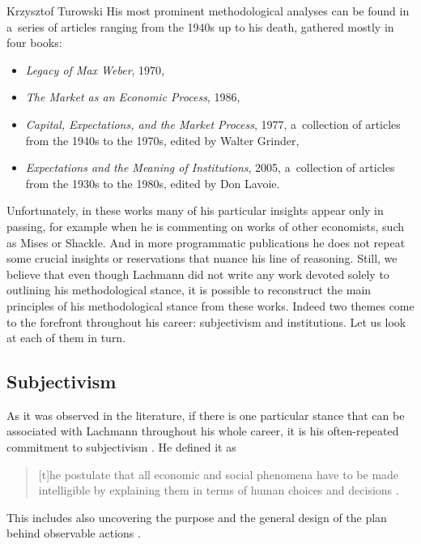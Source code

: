 \begin{artengenv}{Krzysztof Turowski}
His most prominent methodological analyses can be found in a~series of articles ranging from the 1940s up to his death, gathered mostly in four books:
\begin{itemize}
\item \emph{Legacy of Max Weber}, 1970,
\item \emph{The Market as an Economic Process}, 1986,
\item \emph{Capital, Expectations, and the Market Process}, 1977, a~collection of articles from the 1940s to the 1970s, edited by Walter Grinder,
\item \emph{Expectations and the Meaning of Institutions}, 2005, a~collection of articles from the 1930s to the 1980s, edited by Don Lavoie.
\end{itemize}
Unfortunately, in these works many of his particular insights appear only in passing, for example when he is commenting on works of other economists, such as Mises or Shackle. And in more programmatic publications he does not repeat some crucial insights or reservations that nuance his line of reasoning.
Still, we believe that even though Lachmann did not write any work devoted solely to outlining his methodological stance, it is possible to reconstruct the main principles of his methodological stance from these works. Indeed two themes come to the forefront throughout his career: subjectivism and institutions. Let us look at each of them in turn.

\subsection{Subjectivism}


As it was observed in the literature, if there is one particular stance that can be associated with Lachmann throughout his whole career, it is his often-repeated commitment to subjectivism \parencite[3]{grinder-introduction}. He defined it as
\begin{quote}
[t]he postulate that all economic and social phenomena have to be made intelligible by explaining them in terms of human choices and decisions \parencite[10]{lachmann1973macro}.
\end{quote}
This includes also uncovering the purpose and the general design of the plan behind observable actions \parencite[71--72]{lachmann-expectations}.


\end{artengenv}
